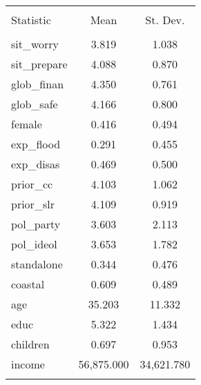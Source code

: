 
\begin{table}[!htbp] \centering 
  \caption{} 
  \label{} 
\begin{tabular}{@{\extracolsep{5pt}}lcc} 
\\[-1.8ex]\hline 
\hline \\[-1.8ex] 
Statistic & \multicolumn{1}{c}{Mean} & \multicolumn{1}{c}{St. Dev.} \\ 
\hline \\[-1.8ex] 
sit\_worry & 3.819 & 1.038 \\ 
sit\_prepare & 4.088 & 0.870 \\ 
glob\_finan & 4.350 & 0.761 \\ 
glob\_safe & 4.166 & 0.800 \\ 
female & 0.416 & 0.494 \\ 
exp\_flood & 0.291 & 0.455 \\ 
exp\_disas & 0.469 & 0.500 \\ 
prior\_cc & 4.103 & 1.062 \\ 
prior\_slr & 4.109 & 0.919 \\ 
pol\_party & 3.603 & 2.113 \\ 
pol\_ideol & 3.653 & 1.782 \\ 
standalone & 0.344 & 0.476 \\ 
coastal & 0.609 & 0.489 \\ 
age & 35.203 & 11.332 \\ 
educ & 5.322 & 1.434 \\ 
children & 0.697 & 0.953 \\ 
income & 56,875.000 & 34,621.780 \\ 
\hline \\[-1.8ex] 
\end{tabular} 
\end{table} 

